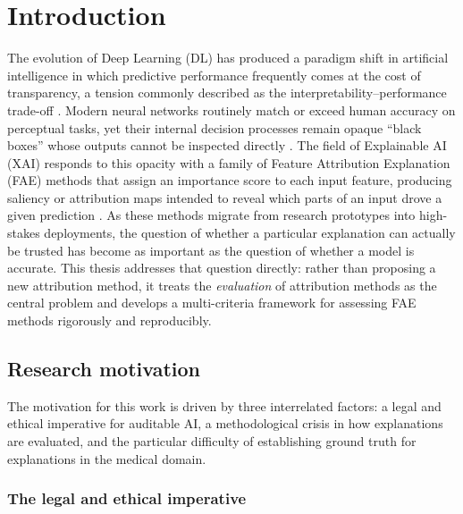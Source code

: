 

\chapter{Introduction}
\label{cha:introduction}

The evolution of Deep Learning (DL) has produced a paradigm shift in artificial
intelligence in which predictive performance frequently comes at the cost of
transparency, a tension commonly described as the interpretability--performance
trade-off \cite{doshi2017rigorous}. Modern neural networks routinely match or
exceed human accuracy on perceptual tasks, yet their internal decision processes
remain opaque ``black boxes'' whose outputs cannot be inspected directly
\cite{adebayo2018sanity}. The field of Explainable AI (XAI) responds to this
opacity with a family of Feature Attribution Explanation (FAE) methods that
assign an importance score to each input feature, producing saliency or
attribution maps intended to reveal which parts of an input drove a given
prediction \cite{selvaraju2017grad, ribeiro2016why}. As these methods migrate
from research prototypes into high-stakes deployments, the question of whether a
particular explanation can actually be trusted has become as important as the
question of whether a model is accurate. This thesis addresses that question
directly: rather than proposing a new attribution method, it treats the
\emph{evaluation} of attribution methods as the central problem and develops a
multi-criteria framework for assessing FAE methods rigorously and reproducibly.

\section{Research motivation}
\label{sec:motivation}

The motivation for this work is driven by three interrelated factors: a legal
and ethical imperative for auditable AI, a methodological crisis in how
explanations are evaluated, and the particular difficulty of establishing
ground truth for explanations in the medical domain.

\subsection{The legal and ethical imperative}

